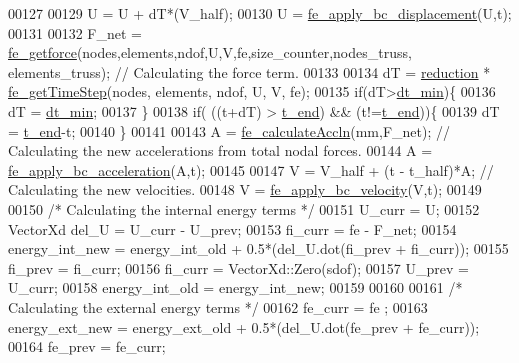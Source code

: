 \begin{DoxyCode}
00127 
00129                 U = U + dT*(V\_half);
00130                 U = \hyperlink{functions_8h_af42938e5b32edb33ef4a35866949eba6}{fe\_apply\_bc\_displacement}(U,t);
00131 
00132                 F\_net = \hyperlink{functions_8h_a6696827a8591495e5ea710b112fad5ef}{fe\_getforce}(nodes,elements,ndof,U,V,fe,size\_counter,nodes\_truss,
      elements\_truss); \textcolor{comment}{// Calculating the force term.}
00133 
00134                 dT = \hyperlink{_global_variables_8h_a7700f3aeb1ca1c9bbbf712dbfb0aa349}{reduction} * \hyperlink{functions_8h_a537640b537f4b485607b062f2c25d974}{fe\_getTimeStep}(nodes, elements, ndof, U, V, fe);
00135                 \textcolor{keywordflow}{if}(dT>\hyperlink{_global_variables_8h_a0a612324885914b6799185d54c48b310}{dt\_min})\{
00136                     dT = \hyperlink{_global_variables_8h_a0a612324885914b6799185d54c48b310}{dt\_min};
00137                 \}
00138                 \textcolor{keywordflow}{if}( ((t+dT) > \hyperlink{_global_variables_8h_a4b637c5fff609e604a3b2b2787f4a9fa}{t\_end}) && (t!=\hyperlink{_global_variables_8h_a4b637c5fff609e604a3b2b2787f4a9fa}{t\_end}))\{
00139                     dT = \hyperlink{_global_variables_8h_a4b637c5fff609e604a3b2b2787f4a9fa}{t\_end}-t;
00140                 \}
00141 
00143                 A = \hyperlink{functions_8h_a049ed85fefb5b5e80e42432fdcc640fa}{fe\_calculateAccln}(mm,F\_net); \textcolor{comment}{// Calculating the new accelerations from
       total nodal forces.}
00144                 A = \hyperlink{functions_8h_ac0ffd5f19ac286c91d431a4ec72dbab4}{fe\_apply\_bc\_acceleration}(A,t);
00145 
00147                 V = V\_half + (t - t\_half)*A; \textcolor{comment}{// Calculating the new velocities.}
00148                 V = \hyperlink{functions_8h_a4627586ca0e6b9e3904cdbc7bb561e9e}{fe\_apply\_bc\_velocity}(V,t);
00149 
00150                 \textcolor{comment}{/* Calculating the internal energy terms */}
00151                 U\_curr = U;
00152                 VectorXd del\_U = U\_curr - U\_prev;
00153                 fi\_curr = fe - F\_net;
00154                 energy\_int\_new = energy\_int\_old + 0.5*(del\_U.dot(fi\_prev + fi\_curr));
00155                 fi\_prev = fi\_curr;
00156                 fi\_curr = VectorXd::Zero(sdof);
00157                 U\_prev = U\_curr;
00158                 energy\_int\_old = energy\_int\_new;
00159 
00160 
00161                 \textcolor{comment}{/* Calculating the external energy terms */}
00162                 fe\_curr = fe ;
00163                 energy\_ext\_new = energy\_ext\_old + 0.5*(del\_U.dot(fe\_prev + fe\_curr));
00164                 fe\_prev = fe\_curr;

\end{DoxyCode}
